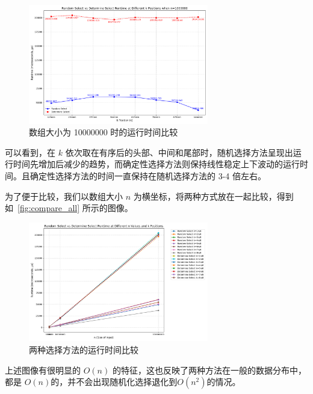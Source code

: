 \begin{figure}[H]
    \centering
    \includegraphics[width=0.7\textwidth]{../figure/10000000.png}
    \caption{数组大小为 10000000 时的运行时间比较}
\end{figure}

可以看到，在 $k$ 依次取在有序后的头部、中间和尾部时，随机选择方法呈现出运行时间先增加后减少的趋势，而确定性选择方法则保持线性稳定上下波动的运行时间。且确定性选择方法的时间一直保持在随机选择方法的 3-4 倍左右。

为了便于比较，我们以数组大小 $n$ 为横坐标，将两种方式放在一起比较，得到如~\autoref{fig:compare_all} 所示的图像。
\begin{figure}[H]
    \centering
    \includegraphics[width=0.7\textwidth]{../figure/compare_all.png}
    \caption{两种选择方法的运行时间比较}
    \label{fig:compare_all}
\end{figure}

上述图像有很明显的 $O(n)$ 的特征，这也反映了两种方法在一般的数据分布中，都是 $O(n)$的，并不会出现随机化选择退化到$O(n^2)$的情况。

